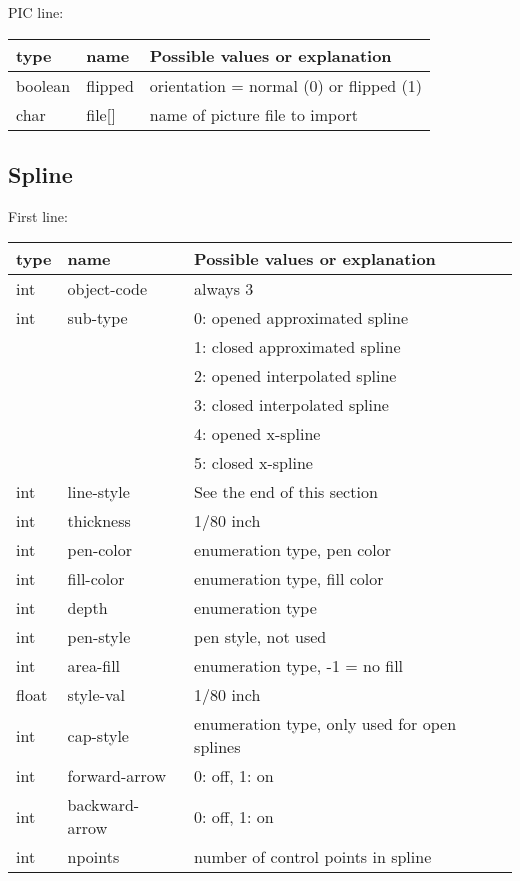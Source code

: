 \documentclass[10pt, a4paper]{article}
\begin{document}
    PIC line:

\begin{tabular}{|lll|}
\hline
type & name & Possible values or explanation \\
\hline
\hline
boolean & flipped & orientation = normal (0) or flipped (1)\\
char    & file[]  & name of picture file to import\\
\hline
\end{tabular}

\subsection{Spline}\label{subsec:spline}

First line:

\begin{tabular}{|lll|}
\hline
type & name & Possible values or explanation \\
\hline
\hline
int   & object-code    & always 3 \\
int   & sub-type       & 0: opened approximated spline \\
&&                       1: closed approximated spline \\
&&                       2: opened interpolated spline \\
&&                       3: closed interpolated spline \\
&&                       4: opened x-spline \\
&&                       5: closed x-spline \\
int   & line-style     & See the end of this section \\
int   & thickness      & 1/80 inch \\
int   & pen-color      & enumeration type, pen color \\
int   & fill-color     & enumeration type, fill color \\
int   & depth          & enumeration type \\
int   & pen-style      & pen style, not used \\
int   & area-fill      & enumeration type, -1 = no fill \\
float & style-val      & 1/80 inch \\
int   & cap-style      & enumeration type, only used for open splines \\
int   & forward-arrow  & 0: off, 1: on \\
int   & backward-arrow & 0: off, 1: on \\
int   & npoints        & number of control points in spline \\
\hline
\end{tabular}
\end{document}
